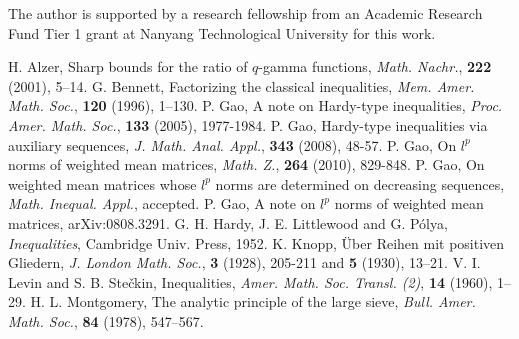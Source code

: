 \documentclass[11pt]{amsart}
\numberwithin{equation}{section}
\theoremstyle{definition}
\theoremstyle{remark}
\begin{document}
  The author is supported by a research fellowship from an Academic
Research Fund Tier 1 grant at Nanyang Technological University for
this work.
\begin{thebibliography}{99}
 H. Alzer, Sharp bounds for the ratio of $q$-gamma
functions, {\em Math. Nachr.}, {\bf 222} (2001), 5--14.
 G. Bennett, Factorizing the classical inequalities,
{\em Mem. Amer. Math. Soc.}, {\bf 120} (1996), 1--130.
P. Gao, {A note on Hardy-type inequalities}, {\it Proc. Amer.
Math. Soc.}, \textbf{133} (2005), 1977-1984.
P. Gao, {Hardy-type inequalities via auxiliary sequences}, {\it J.
Math. Anal. Appl.}, \textbf{343} (2008), 48-57.
 P. Gao, {On $l^p$ norms of weighted mean matrices}, {\it Math. Z.}, \textbf{264} (2010), 829-848.
 P. Gao, {On weighted mean matrices whose $l^p$ norms are
determined on decreasing sequences}, {\it  Math. Inequal. Appl.},
accepted.
 P. Gao, {A note on $l^p$ norms of weighted mean matrices},
arXiv:0808.3291.
 G. H. Hardy, J. E. Littlewood and G. P\'{o}lya, {\em
Inequalities}, Cambridge Univ. Press, 1952.
 K. Knopp, \"Uber Reihen mit positiven Gliedern,
\emph{J. London Math. Soc.}, {\bf 3} (1928), 205-211 and {\bf 5}
(1930), 13--21.
 V. I. Levin and S. B. Ste\v ckin, Inequalities, {\em
Amer. Math. Soc. Transl. (2)}, {\bf 14} (1960),  1--29.
H. L. Montgomery, The analytic principle of the large sieve, {\em   Bull. Amer. Math. Soc.}, {\bf 84} (1978), 547--567.
\end{thebibliography}
\end{document}
